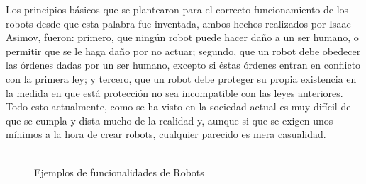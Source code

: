 \hspace{1cm} Los principios básicos que se plantearon para el correcto funcionamiento de los robots desde que esta palabra fue inventada, ambos hechos realizados por Isaac Asimov, fueron: primero, que ningún robot puede hacer daño a un ser humano, o permitir que se le haga daño por no actuar; segundo, que un robot debe obedecer las órdenes dadas por un ser humano, excepto si éstas órdenes entran en conflicto con la primera ley; y tercero, que un robot debe proteger su propia existencia en la medida en que está protección no sea incompatible con las leyes anteriores. Todo esto actualmente, como se ha visto en la sociedad actual es muy difícil de que se cumpla y dista mucho de la realidad y, aunque si que se exigen unos mínimos a la hora de crear robots, cualquier parecido es mera casualidad.
\\
\\
\begin{figure}[H]
 \centering
 \caption{Ejemplos de funcionalidades de Robots}
 \label{f:Ejemplos de funcionalidades de Robots}
\end{figure}  


